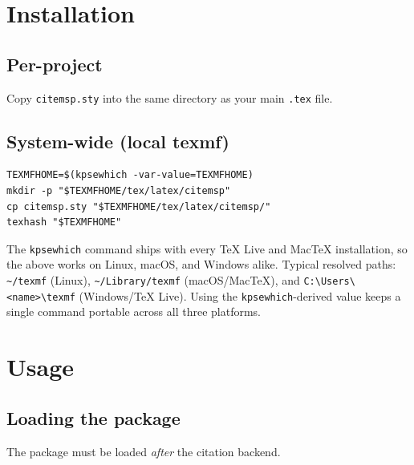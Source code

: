 \documentclass[11pt, a4paper]{article}
\begin{document}
\section{Installation}

\subsection{Per-project}

Copy \texttt{citemsp.sty} into the same directory as your main
\texttt{.tex} file.

\subsection{System-wide (local texmf)}

\begin{tcolorbox}[colback=gray!5, colframe=gray!40, boxrule=0.5pt, arc=2pt,
  top=6pt, bottom=6pt, left=10pt, right=10pt]
\begin{verbatim}
TEXMFHOME=$(kpsewhich -var-value=TEXMFHOME)
mkdir -p "$TEXMFHOME/tex/latex/citemsp"
cp citemsp.sty "$TEXMFHOME/tex/latex/citemsp/"
texhash "$TEXMFHOME"
\end{verbatim}
\end{tcolorbox}
%
\noindent The \verb|kpsewhich| command ships with every TeX Live and MacTeX
installation, so the above works on Linux, macOS, and Windows alike.
Typical resolved paths: \verb|~/texmf| (Linux), \verb|~/Library/texmf|
(macOS/MacTeX), and \verb|C:\Users\<name>\texmf| (Windows/TeX Live).
Using the \verb|kpsewhich|-derived value keeps a single command portable
across all three platforms.


\section{Usage}

\subsection{Loading the package}

The package must be loaded \emph{after} the citation backend.
\end{document}
